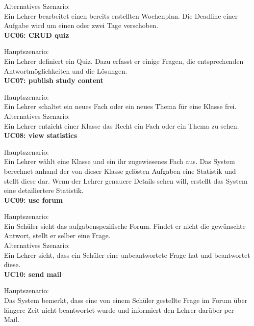 \noindent Alternatives Szenario: \\
Ein Lehrer bearbeitet einen bereits erstellten Wochenplan. Die Deadline einer Aufgabe wird um einen oder zwei Tage verschoben. \\


\noindent \textbf{UC06: CRUD quiz}

\noindent Hauptszenario: \\
Ein Lehrer definiert ein Quiz. Dazu erfasst er einige Fragen, die entsprechenden Antwortmöglichkeiten und die Lösungen. \\


\noindent \textbf{UC07: publish study content}

\noindent Hauptszenario: \\
Ein Lehrer schaltet ein neues Fach oder ein neues Thema für eine Klasse frei. \\

\noindent Alternatives Szenario: \\
Ein Lehrer entzieht einer Klasse das Recht ein Fach oder ein Thema zu sehen. \\


\noindent \textbf{UC08: view statistics}

\noindent Hauptszenario: \\
Ein Lehrer wählt eine Klasse und ein ihr zugewiesenes Fach aus. Das System berechnet anhand der von dieser Klasse gelösten Aufgaben eine Statistik und stellt diese dar. Wenn der Lehrer genauere Details sehen will, erstellt das System eine detailiertere Statistik. \\


\noindent \textbf{UC09: use forum}

\noindent Hauptszenario: \\
Ein Schüler sieht das aufgabenspezifische Forum. Findet er nicht die gewünschte Antwort, stellt er selber eine Frage. \\

\noindent Alternatives Szenario: \\
Ein Lehrer sieht, dass ein Schüler eine unbeantwortete Frage hat und beantwortet diese. \\


\noindent \textbf{UC10: send mail}

\noindent Hauptszenario: \\
Das System bemerkt, dass eine von einem Schüler gestellte Frage im Forum über längere Zeit nicht beantwortet wurde und informiert den Lehrer darüber per Mail. \\


